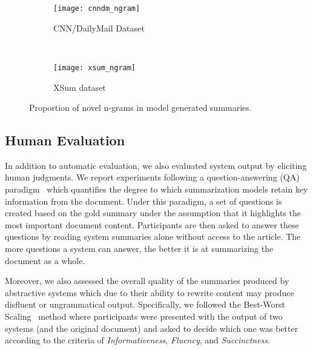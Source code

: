 \documentclass[11pt,a4paper]{article}
\begin{document}
    
    \begin{figure}[t]
        \centering
        \begin{subfigure}{0.5\textwidth}
            \centering
            \texttt{[image: cnndm\_ngram]}
            \caption{CNN/DailyMail Dataset}
            \label{fig:inclu}
        \end{subfigure}\\
        \begin{subfigure}{0.5\textwidth}
            \centering
            \texttt{[image: xsum\_ngram]}
            \caption{XSum dataset}
            
            \label{fig:deform}
        \end{subfigure}
        \caption{Proportion of novel n-grams in model generated
            summaries.}
        \label{fig:manmade}
    \end{figure}
    
    
    
    
    \subsection{Human Evaluation}   
    \label{sec:human-evaluation}
    
    In addition to automatic evaluation, we also evaluated system output
    by eliciting human judgments.  We report experiments following a
    question-answering (QA)
    paradigm~\citep{clarke2010discourse,narayan2018ranking} which
    quantifies the degree to which summarization models retain key
    information from the document. Under this paradigm, a set of questions
    is created based on the gold summary under the assumption that it
    highlights the most important document content. Participants are then
    asked to answer these questions by reading system summaries alone
    without access to the article. The more questions a system can answer,
    the better it is at summarizing the document as a whole. 
    
    Moreover, we also assessed the overall
    quality of the summaries produced by abstractive systems which due to
    their ability to rewrite content may produce disfluent or
    ungrammatical output.  Specifically, we followed the Best-Worst
    Scaling~\cite{bestworstscaling} method where participants were
    presented with the output of two systems (and the original document)
    and asked to decide which one was better according to the criteria of
    \emph{Informativeness}, \emph{Fluency}, and \emph{Succinctness}.
    
\end{document}
